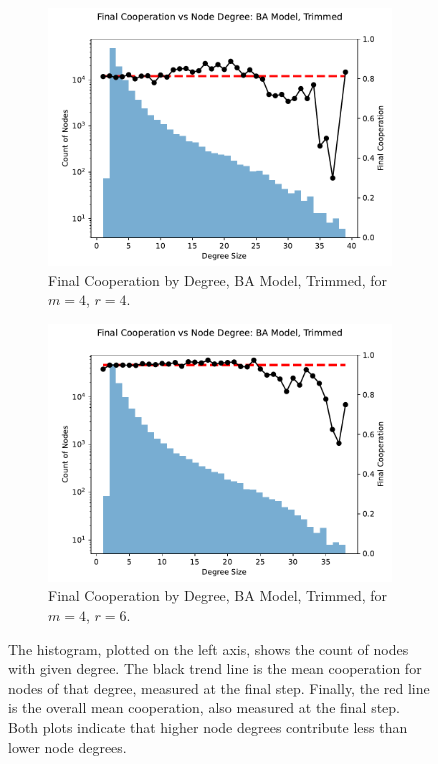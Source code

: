 \FloatBarrier 
\begin{figure}[!h]
  \begin{subfigure}[b]{0.45\textwidth}
    \includegraphics[width=1.1\textwidth]{images/Rep_BA_node_groups_m_4_phi_4_trimmed.pdf}
    \caption{Final Cooperation by Degree, BA Model, Trimmed, for $m=4$, $r=4$.   }
    \label{by_degree_m_4_phi_4}
  \end{subfigure}
  \hfill
  \begin{subfigure}[b]{0.45\textwidth}
    \includegraphics[width=1.1\textwidth]{images/Rep_BA_node_groups_m_4_phi_6_trimmed.pdf}
    \caption{Final Cooperation by Degree, BA Model, Trimmed, for $m=4$, $r=6$. }
    \label{by_degree_m_4_phi_6}
  \end{subfigure}
  \caption{The histogram, plotted on the left axis, shows the count of nodes with given degree. The black trend line is the mean cooperation for nodes of that degree, measured at the final step. Finally, the red line is the overall mean cooperation, also measured at the final step. Both plots indicate that higher node degrees contribute less than lower node degrees.} \label{by_degree_m_4}
\end{figure} 
\FloatBarrier

